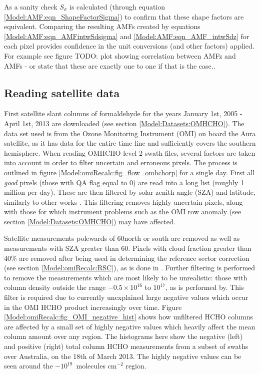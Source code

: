     As a sanity check $S_\sigma$ is calculated (through equation \ref{Model:AMF:eqn_ShapeFactorSigma}) to confirm that these shape factors are equivalent.
    Comparing the resulting AMFs created by equations \ref{Model:AMF:eqn_AMFintwSdsigma} and \ref{Model:AMF:eqn_AMF_intwSdz} for each pixel provides confidence in the unit conversions (and other factors) applied.
    For example see figure TODO: plot showing correlation between AMFz and AMFs - or state that these are exactly one to one if that is the case..
    
    
    
  \subsection{Reading satellite data}
    
    First satellite slant columns of formaldehyde for the years January 1st, 2005 - April 1st, 2013 are downloaded (see section \ref{Model:Datasets:OMHCHO}).
    The data set used is from the Ozone Monitoring Instrument (OMI) on board the Aura satellite, as it has data for the entire time line and sufficiently covers the southern hemisphere.
    When reading OMHCHO level 2 swath files, several factors are taken into account in order to filter uncertain and erroneous pixels.
    The process is outlined in figure  \ref{Model:omiRecalc:fig_flow_omhchorp} for a single day.
    First all \textit{good} pixels (those with QA flag equal to 0) are read into a long list (roughly 1 million per day).
    These are then filtered by solar zenith angle (SZA) and latitude, similarly to other works \parencite[eg.]{Marais2012, Barkley2013, Bauwens2016, Zhu2016}.
    This filtering removes highly uncertain pixels, along with those for which instrument problems such as the OMI row anomaly (see section \ref{Model:Datasets:OMHCHO}) may have affected.
    
    Satellite measurements polewards of 60\degr north or south are removed as well as measurements with SZA greater than 60\degr.
    Pixels with cloud fraction greater than 40\% are removed after being used in determining the reference sector correction (see section \ref{Model:omiRecalc:RSC}), as is done in \textcite{Abad2015, DeSmedt2015}.
    Further filtering is performed to remove the measurements which are most likely to be unrealistic: those with column density outside the range $-0.5 \times 10^{16}$ to $10^{17} $\moleccm, as is performed by\textcite{Zhu2016}.
    This filter is required due to currently unexplained large negative values which occur in the OMI HCHO product increasingly over time.
    Figure \ref{Model:omiRecalc:fig_OMI_negative_hist} shows how unfiltered HCHO columns are affected by a small set of highly negative values which heavily affect the mean column amount over any region.
    The histograms here show the negative (left) and positive (right) total column HCHO measurements from a subset of swaths over Australia, on the 18th of March 2013.
    The highly negative values can be seen around the $-10^{19}$~molecules cm$^{-2}$ region.
    

